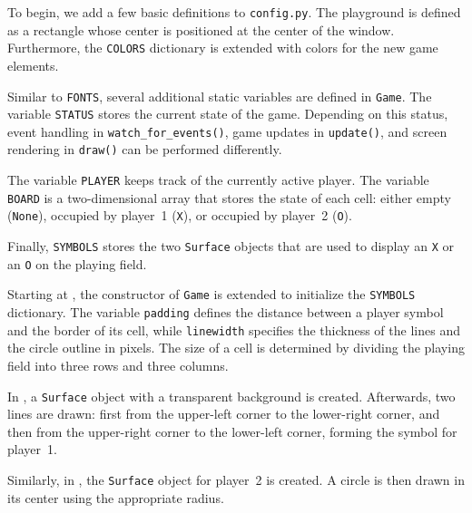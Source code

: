 To begin, we add a few basic definitions to \texttt{config.py}. The playground is defined as a rectangle whose center is positioned at the center of the window. Furthermore, the \texttt{COLORS} dictionary is extended with colors for the new game elements.


Similar to \texttt{FONTS}, several additional static variables are defined in \texttt{Game}. The variable \texttt{STATUS} stores the current state of the game. Depending on this status, event handling in \texttt{watch\_for\_events()}, game updates in \texttt{update()}, and screen rendering in \texttt{draw()} can be performed differently.

The variable \texttt{PLAYER} keeps track of the currently active player. The variable \texttt{BOARD} is a two-dimensional array that stores the state of each cell: either empty (\texttt{None}), occupied by player~1 (\texttt{X}), or occupied by player~2 (\texttt{O}).

Finally, \texttt{SYMBOLS} stores the two \texttt{Surface} objects that are used to display an \texttt{X} or an \texttt{O} on the playing field.


Starting at , the constructor of \texttt{Game} is extended to initialize the \texttt{SYMBOLS} dictionary. The variable \texttt{padding} defines the distance between a player symbol and the border of its cell, while \texttt{linewidth} specifies the thickness of the lines and the circle outline in pixels. The size of a cell is determined by dividing the playing field into three rows and three columns.

In , a \texttt{Surface} object with a transparent background is created. Afterwards, two lines are drawn: first from the upper-left corner to the lower-right corner, and then from the upper-right corner to the lower-left corner, forming the symbol for player~1.

Similarly, in , the \texttt{Surface} object for player~2 is created. A circle is then drawn in its center using the appropriate radius.

